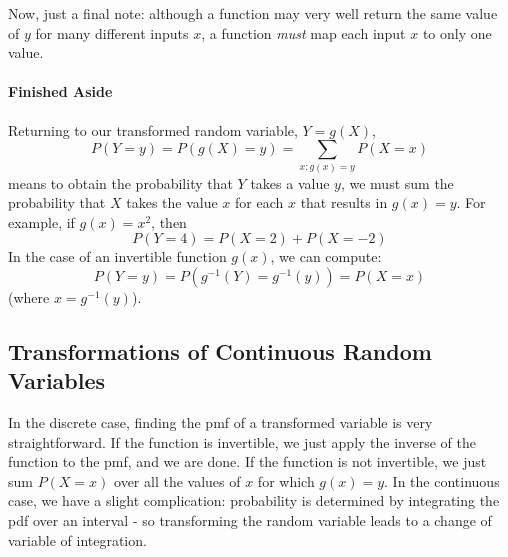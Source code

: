 \documentclass[12pt]{article} %
\begin{document}
Now, just a final note: although a function may very well return the same value of $y$ for many different inputs $x$, a function \emph{must} map each input $x$ to only one value. 


\paragraph{Finished Aside}

Returning to our transformed random variable, $Y=g(X)$,
$$P(Y=y) = P(g(X) = y) = \sum_{x:g(x)=y} P(X=x)$$
means to obtain the probability that $Y$ takes a value $y$, we must sum the probability that $X$ takes the value $x$ for each $x$ that results in $g(x) = y$. For example, if $g(x) = x^2$, then 
$$P(Y=4) = P(X=2) + P(X=-2)$$
In the case of an invertible function $g(x)$, we can compute:
$$P(Y=y) = P(g^{-1}(Y)=g^{-1}(y)) = P(X = x)$$
(where $x=g^{-1}(y)$).

\subsection{Transformations of Continuous Random Variables}
In the discrete case, finding the pmf of a transformed variable is very straightforward. If the function is invertible, we just apply the inverse of the function to the pmf, and we are done. If the function is not invertible, we just sum $P(X=x)$ over all the values of $x$ for which $g(x) = y$. In the continuous case, we have a slight complication: probability is determined by integrating the pdf over an interval - so transforming the random variable leads to a change of variable of integration.\\\\
\end{document}

